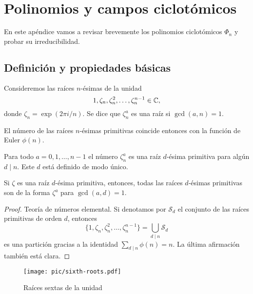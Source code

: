 \chapter{Polinomios y campos ciclotómicos}
\label{ap:polinomios-ciclotomicos}

En este apéndice vamos a revisar brevemente los polinomios ciclotómicos $\Phi_n$
y probar su irreducibilidad.

\section{Definición y propiedades básicas}

\begin{definicion}
  Consideremos las raíces $n$-ésimas de la unidad
  $$1, \zeta_n, \zeta_n^2, \ldots, \zeta_n^{n-1} \in \mathbb{C},$$
  donde $\zeta_n = \exp (2\pi i/n)$. Se dice que $\zeta_n^a$ es una raíz
   si $\gcd (a,n) = 1$.
\end{definicion}

El número de las raíces $n$-ésimas primitivas coincide entonces con la función
de Euler $\phi (n)$.

\begin{lema}
  \label{lema:descomposicion-en-raices-primitivas}
  Para todo $a = 0,1,\ldots,n-1$ el número $\zeta_n^a$ es una raíz $d$-ésima
  primitiva para algún $d \mid n$. Este $d$ está definido de modo único.

  Si $\zeta$ es una raíz $d$-ésima primitiva, entonces, todas las raíces
  $d$-ésimas primitivas son de la forma $\zeta^a$ para $\gcd (a,d) = 1$.

  \begin{proof}
    Teoría de números elemental. Si denotamos por $\mathcal{S}_d$ el conjunto de
    las raíces primitivas de orden $d$, entonces
    \[ \{ 1, \zeta_n, \zeta_n^2, \ldots, \zeta_n^{n-1} \} =
        \bigcup_{d\mid n} \mathcal{S}_d \]
    es una partición gracias a la identidad $\sum_{d\mid n} \phi (n) = n$.
    La última afirmación también está clara.
  \end{proof}
\end{lema}

\begin{figure}
  \begin{center}
    \texttt{[image: pic/sixth-roots.pdf]}
  \end{center}

  \caption{Raíces sextas de la unidad}
\end{figure}

